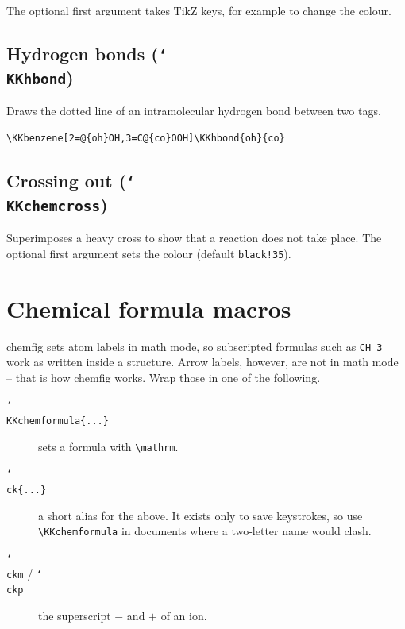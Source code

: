\documentclass[paper=a4paper,fontsize=10pt]{jlreq}
\begin{document}
The optional first argument takes TikZ keys, for example to change the colour.

\subsection{Hydrogen bonds (\texttt{\char`\\KKhbond})}

Draws the dotted line of an intramolecular hydrogen bond between two tags.

\begin{verbatim}
\KKbenzene[2=@{oh}OH,3=C@{co}OOH]\KKhbond{oh}{co}
\end{verbatim}

\begin{center}
\KKbenzene[2=@{oh}OH,3=C@{co}OOH]
\end{center}

\subsection{Crossing out (\texttt{\char`\\KKchemcross})}

Superimposes a heavy cross to show that a reaction does not take place. The
optional first argument sets the colour (default \verb|black!35|).

\begin{center}
\KKchemcross{\KKphenol}
\end{center}

\section{Chemical formula macros}

\textsf{chemfig} sets atom labels in math mode, so subscripted formulas such as
\verb|CH_3| work as written inside a structure. Arrow labels, however, are not in
math mode -- that is how \textsf{chemfig} works. Wrap those in one of the
following.

\begin{description}
\item[\texttt{\char`\\KKchemformula\{...\}}] sets a formula with \verb|\mathrm|.
\item[\texttt{\char`\\ck\{...\}}] a short alias for the above. It exists only to save
      keystrokes, so use \verb|\KKchemformula| in documents where a two-letter
      name would clash.
\item[\texttt{\char`\\ckm} / \texttt{\char`\\ckp}] the superscript $-$ and $+$ of an ion.
\end{description}
\end{document}

